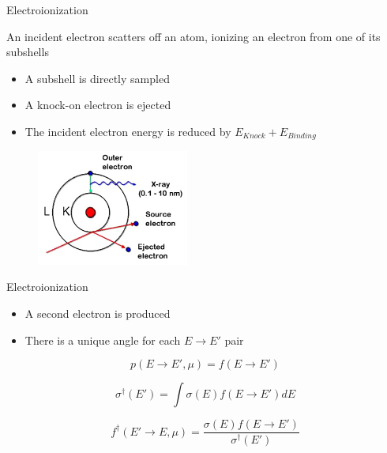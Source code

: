 \documentclass{beamer}
\begin{document}
    \begin{frame}{Electroionization}

  \begin{block}{An incident electron scatters off an atom, ionizing an electron from one of its subshells}
    \begin{itemize}
      \item A subshell is directly sampled
      \item A knock-on electron is ejected
      \item The incident electron energy is reduced by $E_{Knock} + E_{Binding}$
    \end{itemize}
  \end{block}
  
      \begin{figure}
     \includegraphics[width=50mm]{Inner_Shell_Ionization.jpg}
   \end{figure}

\end{frame}

\begin{frame}{Electroionization}
	\begin{itemize}
	\item A second electron is produced
	\item There is a unique angle for each $E \rightarrow E'$ pair
	\end{itemize}

\begin{equation}
p(E \rightarrow E', \mu) = f(E \rightarrow E')
\end{equation}

\begin{equation}
\sigma^{\dagger}(E') = \int\sigma(E)f(E \rightarrow E')dE
\end{equation}

\begin{equation}
f^{\dagger}(E'\rightarrow E, \mu) = \frac{\sigma(E)f(E \rightarrow E')}{\sigma^{\dagger}(E')} 
\end{equation}

\end{frame}
\end{document}
